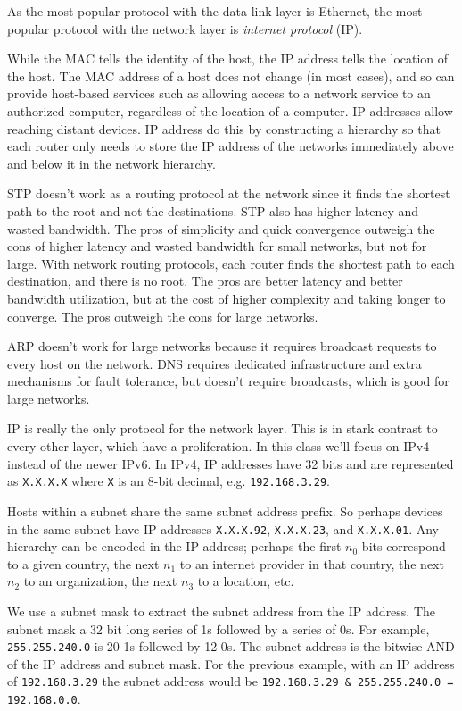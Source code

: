 As the most popular protocol with the
data link layer is Ethernet, the most
popular protocol with the network
layer is \emph{internet protocol}
(IP).

While the MAC tells the identity
of the host, the IP address tells
the location of the host. The MAC
address of a host does not change
(in most cases), and so can provide
host-based services such as allowing
access to a network service to an
authorized computer, regardless of
the location of a computer. IP
addresses allow reaching distant
devices. IP address do this by
constructing a hierarchy so that
each router only needs to store
the IP address of the networks
immediately above and below it
in the network hierarchy.

STP doesn't work as a routing
protocol at the network since
it finds the shortest path to
the root and not the destinations.
STP also has higher latency and
wasted bandwidth. The pros of
simplicity and quick convergence
outweigh the cons of higher
latency and wasted bandwidth
for small networks, but not for
large. With network routing
protocols, each router finds
the shortest path to each
destination, and there is no
root. The pros are better
latency and better bandwidth
utilization, but at the cost
of higher complexity and
taking longer to converge. The
pros outweigh the cons for
large networks.

ARP doesn't work for large networks
because it requires broadcast
requests to every host on the
network. DNS requires dedicated
infrastructure and extra mechanisms
for fault tolerance, but doesn't
require broadcasts, which is
good for large networks.

IP is really the only protocol for the network layer.
This is in stark contrast to every other layer, which
have a proliferation. In this class we'll focus on IPv4
instead of the newer IPv6. In IPv4,
IP addresses have 32 bits and are
represented as \texttt{X.X.X.X} where
\texttt{X} is an 8-bit decimal, e.g.
\texttt{192.168.3.29}.

Hosts within a subnet share the same
subnet address prefix. So perhaps
devices in the same subnet have IP
addresses \texttt{X.X.X.92},
\texttt{X.X.X.23}, and \texttt{X.X.X.01}.
Any hierarchy can be encoded in the IP
address; perhaps the first $n_0$ bits
correspond to a given country, the next
$n_1$ to an internet provider in that
country, the next $n_2$ to an organization,
the next $n_3$ to a location, etc.

We use a subnet mask to extract the
subnet address from the IP address.
The subnet mask a 32 bit long series
of 1s followed by a series of 0s.
For example, \texttt{255.255.240.0}
is 20 1s followed by 12 0s. The subnet
address is the bitwise AND of the
IP address and subnet mask. For the
previous example, with an IP address
of \texttt{192.168.3.29} the subnet
address would be
\texttt{192.168.3.29 \& 255.255.240.0 = 192.168.0.0}.

